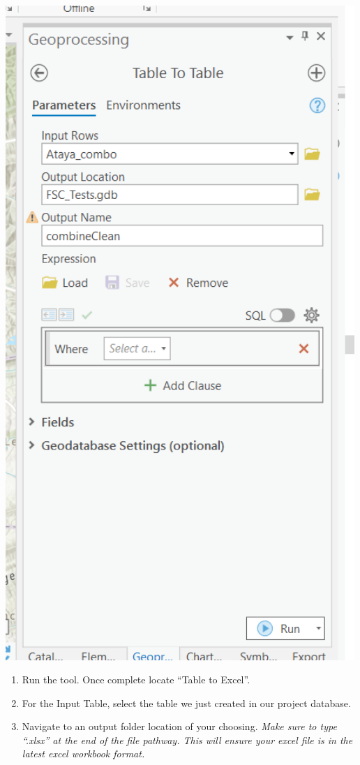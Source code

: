 \documentclass[
]{book}
\providecommand{\tightlist}{%
  \setlength{\itemsep}{0pt}\setlength{\parskip}{0pt}}
\begin{document}
\includegraphics[width=500px]{04_gis_screenshots/19_table_table}

\begin{enumerate}
\def\labelenumi{\arabic{enumi}.}
\setcounter{enumi}{4}
\tightlist
\item
  Run the tool. Once complete locate ``Table to Excel''.
\item
  For the Input Table, select the table we just created in our project database.
\item
  Navigate to an output folder location of your choosing. \emph{Make sure to type ``.xlsx'' at the end of the file pathway. This will ensure your excel file is in the latest excel workbook format.}
\end{enumerate}
\end{document}
